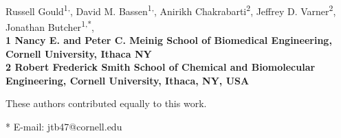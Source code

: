 \documentclass[11pt,letterpaper]{article}
\date{}
\begin{document}
\vspace*{0.35in}
\begin{flushleft}
{\Large
\textbf{}}
\newline
\\
Russell Gould\textsuperscript{1,\Yinyang},
David M. Bassen\textsuperscript{1,\Yinyang},
Anirikh Chakrabarti\textsuperscript{2},
Jeffrey D. Varner\textsuperscript{2},
Jonathan Butcher\textsuperscript{1,*},
\\
\bf{1} Nancy E. and Peter C. Meinig School of Biomedical Engineering, Cornell University, Ithaca NY
\\
\bf{2} Robert Frederick Smith School of Chemical and Biomolecular Engineering, Cornell University, Ithaca, NY, USA

%
%
\Yinyang These authors contributed equally to this work.





* E-mail: jtb47@cornell.edu
\end{flushleft}
\end{document}
